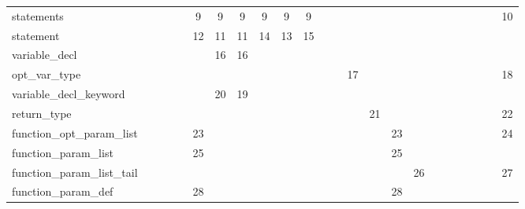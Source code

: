 \begin{table}[htbp]
\begin{tabular}{l|ccccccccccccccccccccccc}
statements                  &                   &          &          &      & 9  & 9     & 9     & 9       & 9    & 9        &        &      &     &                    &      &     &     &       &          &          &     &       & 10      \\
statement                   &                   &          &          &      & 12 & 11    & 11    & 14      & 13   & 15       &        &      &     &                    &      &     &     &       &          &          &     &       &         \\
variable\_decl              &                   &          &          &      &    & 16    & 16    &         &      &          &        &      &     &                    &      &     &     &       &          &          &     &       &         \\
opt\_var\_type              &                   &          &          &      &    &       &       &         &      &          &        &      & 17  &                    &      &     &     &       &          &          &     &       & 18      \\
variable\_decl\_keyword     &                   &          &          &      &    & 20    & 19    &         &      &          &        &      &     &                    &      &     &     &       &          &          &     &       &         \\
return\_type                &                   &          &          &      &    &       &       &         &      &          &        &      &     & 21                 &      &     &     &       &          &          &     &       & 22      \\
function\_opt\_param\_list  &                   &          &          &      & 23 &       &       &         &      &          &        &      &     &                    & 23   &     &     &       &          &          &     &       & 24      \\
function\_param\_list       &                   &          &          &      & 25 &       &       &         &      &          &        &      &     &                    & 25   &     &     &       &          &          &     &       &         \\
function\_param\_list\_tail &                   &          &          &      &    &       &       &         &      &          &        &      &     &                    &      & 26  &     &       &          &          &     &       & 27      \\
function\_param\_def        &                   &          &          &      & 28 &       &       &         &      &          &        &      &     &                    & 28   &     &     &       &          &          &     &       &         \\

\end{tabular}
\end{table}
